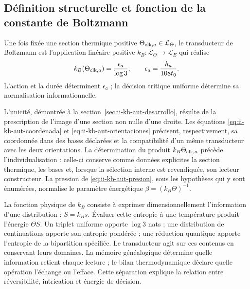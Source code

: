 \subsection{Définition structurelle et fonction de la constante de Boltzmann}
\label{sec:ii-definicion-boltzmann}

\begin{definition}
Une fois fixée une section thermique positive
\(\Theta_{{\rm clk},a}\in\mathcal L_\Theta\), le transducteur
de Boltzmann est l'application linéaire positive
\(k_B:\mathcal L_\Theta\to\mathcal L_E\) qui réalise
\begin{equation}
 k_B(\Theta_{{\rm clk},a})
 =\frac{\epsilon_a}{\log3},
 \qquad \epsilon_a=\frac{h_a}{108t_0}.
 \label{eq:ii-definicion-boltzmann-transductor}
\end{equation}
L'action et la durée déterminent \(\epsilon_a\) ; la décision
tritique uniforme détermine sa normalisation informationnelle.
\end{definition}

L'unicité, démontrée à la section~\ref{sec:ii-kb-aut-desarrollo},
résulte de la prescription de l'image d'une section non nulle d'une droite.
Les équations \eqref{eq:ii-kb-aut-coordenada} et
\eqref{eq:ii-kb-aut-orientaciones} précisent, respectivement, sa
coordonnée dans des bases déclarées et la compatibilité d'un même
transducteur avec les deux orientations. La détermination du produit
\(k_B\Theta_{{\rm clk},a}\) précède l'individualisation :
celle-ci conserve comme données explicites la section thermique, les
bases et, lorsque la sélection interne est revendiquée, son lecteur constructeur.
La pression de \eqref{eq:ii-kb-aut-presion}, sous les hypothèses
qui y sont énumérées, normalise le paramètre énergétique
\(\beta=(k_B\Theta)^{-1}\).

La fonction physique de \(k_B\) consiste à exprimer dimensionnellement
l’information d’une distribution : \(S=k_Bs\). Évaluer cette
entropie à une température produit l’énergie \(\Theta S\).
Un triplet uniforme apporte \(\log3\) nats ; une distribution de
continuations apporte son entropie pondérée ; une réduction quantique
apporte l’entropie de la bipartition spécifiée. Le transducteur
agit sur ces contenus en conservant leurs domaines. La mémoire
généalogique détermine quelle information retient chaque lecture ; le
bilan thermodynamique déclare quelle opération l’échange ou
l’efface. Cette séparation explique la relation entre réversibilité,
intrication et énergie de décision.
